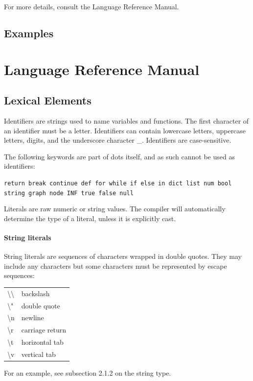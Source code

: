 \documentclass{article}
\newcommand{\code}[1]{\texttt{#1}} %
\begin{document}
For more details, consult the Language Reference Manual. 

\subsection{Examples}

\section{Language Reference Manual}




\subsection{Lexical Elements}


Identifiers are strings used to name variables and functions. 
The first character of an identifier must be a letter. Identifiers can contain lowercase letters, uppercase letters, digits, and the underscore character \textquotesingle\_\textquotesingle. Identifiers are case-sensitive. 


The following keywords are part of dots itself, and as such cannot be used as 
identifiers:

\code{return break continue def for while if else in 
 dict list num bool string graph node INF true false null}


Literals are raw numeric or string values. The compiler will automatically 
determine the type of a literal, unless it is explicitly cast.

\paragraph{String literals}

String literals are sequences of characters wrapped in double quotes. They may 
include any characters but some characters must be represented by escape 
sequences:

\begin{table}[H]
\begin{tabular}{ p{0.5in}  p{2.75in} }
{\textbackslash}{\textbackslash} & backslash \\
{\textbackslash}" & double quote \\
{\textbackslash}n & newline \\
{\textbackslash}r & carriage return \\
{\textbackslash}t & horizontal tab \\
{\textbackslash}v & vertical tab \\
\end{tabular}
\label{tbl:escapes}
\end{table}
For an example, see subsection 2.1.2 on the string type.
\end{document}
